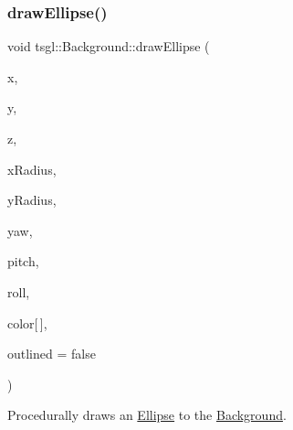 \subsubsection{\texorpdfstring{draw\+Ellipse()}{drawEllipse()}\hspace{0.1cm}{\footnotesize\ttfamily [2/2]}}
{\footnotesize\ttfamily void tsgl\+::\+Background\+::draw\+Ellipse (\begin{DoxyParamCaption}\item[{float}]{x,  }\item[{float}]{y,  }\item[{float}]{z,  }\item[{float}]{x\+Radius,  }\item[{float}]{y\+Radius,  }\item[{float}]{yaw,  }\item[{float}]{pitch,  }\item[{float}]{roll,  }\item[{\hyperlink{structtsgl_1_1_color_float}{Color\+Float}}]{color\mbox{[}$\,$\mbox{]},  }\item[{bool}]{outlined = {\ttfamily false} }\end{DoxyParamCaption})\hspace{0.3cm}{\ttfamily [virtual]}}



Procedurally draws an \hyperlink{classtsgl_1_1_ellipse}{Ellipse} to the \hyperlink{classtsgl_1_1_background}{Background}. 

